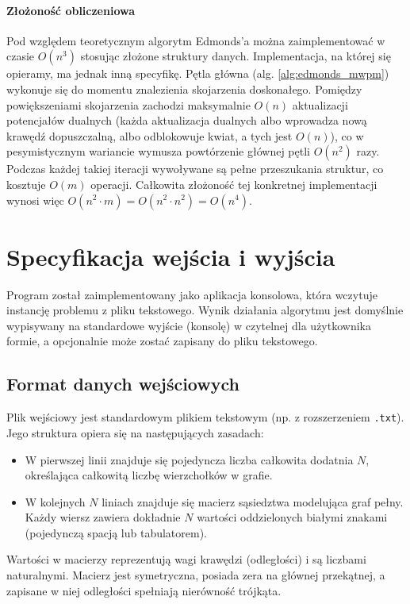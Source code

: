 \documentclass{article}
\theoremstyle{definition}
\theoremstyle{plain}
\theoremstyle{remark}
\begin{document}
\paragraph{Złożoność obliczeniowa}

Pod względem teoretycznym algorytm Edmonds'a można zaimplementować w czasie $O(n^3)$ stosując złożone struktury danych. Implementacja, na której się opieramy, ma jednak inną specyfikę. Pętla główna (alg. \ref{alg:edmonds_mwpm}) wykonuje się do momentu znalezienia skojarzenia doskonałego. Pomiędzy powiększeniami skojarzenia zachodzi maksymalnie $O(n)$ aktualizacji potencjałów dualnych (każda aktualizacja dualnych albo wprowadza nową krawędź 
dopuszczalną, albo odblokowuje kwiat, a tych jest $O(n)$), co w pesymistycznym wariancie wymusza powtórzenie głównej pętli $O(n^2)$ razy. Podczas każdej takiej iteracji wywoływane są pełne przeszukania struktur, co kosztuje $O(m)$ operacji. Całkowita złożoność tej konkretnej implementacji wynosi więc $O(n^2 \cdot m) = O(n^2 \cdot n^2) = O(n^4)$.

\newpage
\section{Specyfikacja wejścia i wyjścia}

Program został zaimplementowany jako aplikacja konsolowa, która wczytuje instancję problemu z pliku tekstowego. Wynik działania algorytmu jest domyślnie wypisywany na standardowe wyjście (konsolę) w czytelnej dla użytkownika formie, a opcjonalnie może zostać zapisany do pliku tekstowego.

\subsection{Format danych wejściowych}

Plik wejściowy jest standardowym plikiem tekstowym (np. z rozszerzeniem \texttt{.txt}). Jego struktura opiera się na następujących zasadach:
\begin{itemize}
    \item W pierwszej linii znajduje się pojedyncza liczba całkowita dodatnia $N$, określająca całkowitą liczbę wierzchołków w grafie.
    \item W kolejnych $N$ liniach znajduje się macierz sąsiedztwa modelująca graf pełny. Każdy wiersz zawiera dokładnie $N$ wartości oddzielonych białymi znakami (pojedynczą spacją lub tabulatorem).
\end{itemize}

Wartości w macierzy reprezentują wagi krawędzi (odległości) i są liczbami naturalnymi. Macierz jest symetryczna, posiada zera na głównej przekątnej, a zapisane w niej odległości spełniają nierówność trójkąta.
\end{document}
